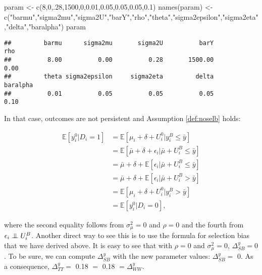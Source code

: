 \documentclass[
]{book}
\newenvironment{Shaded}{\begin{snugshade}}{\end{snugshade}}
\newcommand{\DecValTok}[1]{\textcolor[rgb]{0.00,0.00,0.81}{#1}}
\newcommand{\FloatTok}[1]{\textcolor[rgb]{0.00,0.00,0.81}{#1}}
\newcommand{\FunctionTok}[1]{\textcolor[rgb]{0.00,0.00,0.00}{#1}}
\newcommand{\NormalTok}[1]{#1}
\newcommand{\OtherTok}[1]{\textcolor[rgb]{0.56,0.35,0.01}{#1}}
\newcommand{\StringTok}[1]{\textcolor[rgb]{0.31,0.60,0.02}{#1}}
\newcommand{\esp}[1]{\mathbb{E}[ #1 ]}
\newcommand\Ind{\protect\mathpalette{\protect\independenT}{\perp}}
\def\independenT#1#2{\mathrel{\setbox0\hbox{$#1#2$}\copy0\kern-\wd0\mkern4mu\box0}}
\theoremstyle{definition}
\theoremstyle{definition}
\theoremstyle{definition}
\theoremstyle{definition}
\theoremstyle{remark}
\begin{document}
\begin{Shaded}
\begin{Highlighting}[]
\NormalTok{param }\OtherTok{\textless{}{-}} \FunctionTok{c}\NormalTok{(}\DecValTok{8}\NormalTok{,}\DecValTok{0}\NormalTok{,.}\DecValTok{28}\NormalTok{,}\DecValTok{1500}\NormalTok{,}\DecValTok{0}\NormalTok{,}\FloatTok{0.01}\NormalTok{,}\FloatTok{0.05}\NormalTok{,}\FloatTok{0.05}\NormalTok{,}\FloatTok{0.05}\NormalTok{,}\FloatTok{0.1}\NormalTok{)}
\FunctionTok{names}\NormalTok{(param) }\OtherTok{\textless{}{-}} \FunctionTok{c}\NormalTok{(}\StringTok{"barmu"}\NormalTok{,}\StringTok{"sigma2mu"}\NormalTok{,}\StringTok{"sigma2U"}\NormalTok{,}\StringTok{"barY"}\NormalTok{,}\StringTok{"rho"}\NormalTok{,}\StringTok{"theta"}\NormalTok{,}\StringTok{"sigma2epsilon"}\NormalTok{,}\StringTok{"sigma2eta"}\NormalTok{,}\StringTok{"delta"}\NormalTok{,}\StringTok{"baralpha"}\NormalTok{)}
\NormalTok{param}
\end{Highlighting}
\end{Shaded}

\begin{verbatim}
##         barmu      sigma2mu       sigma2U          barY           rho 
##          8.00          0.00          0.28       1500.00          0.00 
##         theta sigma2epsilon     sigma2eta         delta      baralpha 
##          0.01          0.05          0.05          0.05          0.10
\end{verbatim}

In that case, outcomes are not persistent and Assumption \ref{def:noselb} holds:

\begin{align*}
\esp{y_i^0|D_i=1} & = \esp{\mu_i+\delta+U_i^0|y_i^B\leq\bar{y}}\\
                  & = \esp{\bar{\mu}+\delta+\epsilon_i|\bar{\mu}+U_i^B\leq\bar{y}}\\
                  & = \bar{\mu} + \delta + \esp{\epsilon_i|\bar{\mu}+U_i^B\leq\bar{y}}\\
                  & = \bar{\mu} + \delta + \esp{\epsilon_i|\bar{\mu}+U_i^B>\bar{y}}\\
                  & = \esp{\mu_i+\delta+U_i^0|y_i^B>\bar{y}}\\
                  & = \esp{y_i^0|D_i=0},                  
\end{align*}

where the second equality follows from \(\sigma^2_{\mu}=0\) and \(\rho=0\) and the fourth from \(\epsilon_i \Ind U_i^B\).
Another direct way to see this is to use the formula for selection bias that we have derived above.
It is easy to see that with \(\rho=0\) and \(\sigma^2_{\mu}=0\), \(\Delta^y_{SB}=0\).
To be sure, we can compute \(\Delta^y_{SB}\) with the new parameter values: \(\Delta^y_{SB}=\) 0.
As a consequence, \(\Delta^y_{TT}=\) 0.18 \(=\) 0.18 \(=\Delta^y_{WW}\).
\end{document}
